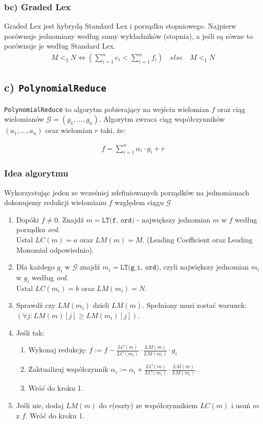 \documentclass[10pt, a4paper]{article}
\begin{document}
\subsubsection*{bc) Graded Lex}

Graded Lex jest hybrydą Standard Lex i porządku stopniowego. 
Najpierw porównuje jednomiany według sumy wykładników (stopnia), 
a jeśli są równe to porównuje je według Standard Lex.
\begin{align*}    
    M <_3 N \iff
    \left(
    \sum_{i=1}^{n} e_i < \sum_{i=1}^{n} f_i
    \right)
    \quad
    else
    \quad
    M <_1 N
\end{align*}

\subsection*{c) \texttt{PolynomialReduce}}

\texttt{PolynomialReduce} to algorytm pobierający na wejściu wielomian $f$ oraz ciąg wielomianów $\mathcal{G}=(g_1,\dots,g_n)$. 
Algorytm zwraca ciąg współczynników $(a_1,\dots,a_n)$ oraz wielomian $r$ taki, że:

\begin{align*}
    f = \sum_{i=1}^{n} \alpha_i \cdot g_i + r
\end{align*}

\subsubsection*{Idea algorytmu}

Wykorzystując jeden ze wcześniej zdefiniowanych porządków na jednomianach dokonujemy redukcji wielomianu $f$ względem ciągu $\mathcal{G}$

\begin{enumerate}
    \item Dopóki $f \neq 0$. Znajdź $m=\texttt{LT(f, ord)}$ - największy jednomian $m$ w $f$ według porządku \textit{ord}. \\ Ustal $LC(m)=a$ oraz $LM(m)=M$. (Leading Coefficient oraz Leading Monomial odpowiednio).
    \item Dla każdego $g_i$ w $\mathcal{G}$ znajdź $m_i=\texttt{LT(g\_i, ord)}$, czyli największy jednomian $m_i$ w $g_i$ według \textit{ord}. \\ Ustal $LC(m_i)=b$ oraz $LM(m_i)=N$.
    \item Sprawdź czy $LM(m_i)$ dzieli $LM(m)$. Spełniony musi zostać warunek: $\left(\forall j: LM(m)[j] \geq LM(m_i)[j]\right)$.
    \item Jeśli tak:
    \begin{enumerate}
        \item Wykonaj redukcję: $f := f - \frac{LC(m)}{LC(m_i)} \cdot \frac{LM(m)}{LM(m_i)} \cdot g_i$
        \item Zaktualizuj współczynnik $\alpha_i := \alpha_i + \frac{LC(m)}{LC(m_i)} \cdot \frac{LM(m)}{LM(m_i)}$.
        \item Wróć do kroku 1.
    \end{enumerate}
    \item Jeśli nie, dodaj $LM(m)$ do $r$(eszty) ze współczynnikiem $LC(m)$ i usuń $m$ z $f$. Wróć do kroku 1.
\end{enumerate}
\end{document}
